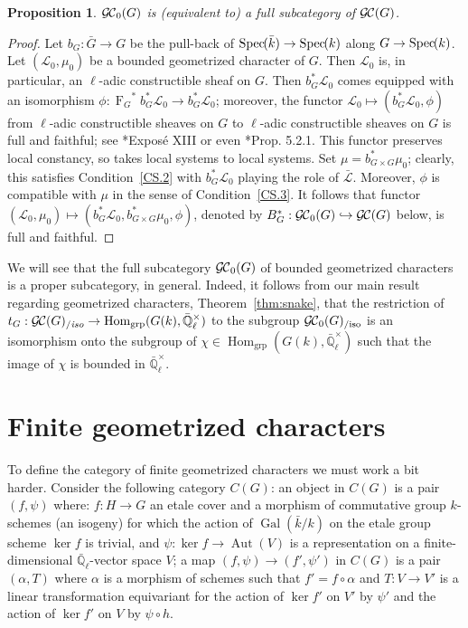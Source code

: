 \documentclass[11pt]{amsart}
\theoremstyle{plain}
\newtheorem{proposition}[theorem]{Proposition}
\theoremstyle{definition}
\theoremstyle{remark}
\newcommand{\Spec}[1]{{\operatorname{Spec}\hskip-1pt( #1 )}}
\newcommand{\EE}{\mathbb{\bar Q}_\ell}
\newcommand{\bFq}{\bar{k}}
\newcommand{\Fq}{k}
\newcommand{\EEx}{\EE^\times}
\DeclareMathOperator{\Gal}{Gal}
\newcommand{\Frob}[1]{{\operatorname{F}_{#1}}}
\DeclareMathOperator{\Aut}{Aut}
\DeclareMathOperator{\Hom}{Hom}
\newcommand{\cdef}[1]{{{\color{blue}#1}\index{#1}}}
\newcommand{\cs}[1]{{\mathcal{#1}}}
\newcommand{\gcs}[1]{{\mathcal{\bar #1}}}
\newcommand{\GC}{{\mathcal{G\hskip-0.8pt C}}}
\newcommand{\GCb}{{\GC_0}}
\newcommand{\GCiso}[1]{\GC(#1)_{/\textit{iso}}}
\newcommand{\GCbiso}[1]{\GCb(#1)_{/\text{iso}}}
\newcommand{\trFrob}[1]{t_{#1}}
\begin{document}
\begin{proposition}
$\GCb(G)$ is (equivalent to) a full subcategory of $\GC(G)$.
\end{proposition}

\begin{proof}
 Let $b_G : {\bar G} \to G$ be the pull-back of $\Spec{\bFq} \to \Spec{\Fq}$ along $G\to \Spec{\Fq}$.
 Let $(\cs{L}_0,\mu_0)$ be a bounded geometrized character of $G$. 
 Then $\cs{L}_0$ is, in particular, an $\ell$-adic constructible sheaf on $G$. 
 Then $b_G^* \cs{L}_0$ comes equipped with an isomorphism 
 $\phi : \Frob{G}^* b_G^*\cs{L}_0 \to b_G^* \cs{L}_0$; 
 moreover, the functor $\cs{L}_0 \mapsto (b_G^* \cs{L}_0,\phi)$  
 from $\ell$-adic constructible sheaves on $G$ to $\ell$-adic constructible sheaves on $G$
 is full and faithful; see \cite{SGA7.2}*{Expos\'e XIII} or even \cite{BBD}*{Prop. 5.2.1}. 
 This functor preserves local constancy, so takes local systems to local systems. 
 Set $\mu = b_{G\times G}^*\mu_0$; clearly, this satisfies Condition~\ref{CS.2} 
 with $b_G^*\cs{L}_0$ playing the role of $\gcs{L}$.
 Moreover, $\phi$ is compatible with $\mu$ in the sense of Condition~\ref{CS.3}.
 It follows that functor $(\cs{L}_0,\mu_0) \mapsto (b_G^*\cs{L}_0,b_{G\times G}^* \mu_0, \phi)$, denoted by  $B_G^*: \GCb(G) \hookrightarrow \GC(G)$ below, is full and faithful.
\end{proof}

We will see that the full subcategory $\GC_0(G)$ of bounded geometrized characters is a proper subcategory, in general. Indeed, it follows from our main result regarding geometrized characters, Theorem~\ref{thm:snake}, that the restriction of $\trFrob{G} : \GCiso{G} \to \Hom_\text{grp}(G(\Fq),\EEx)$ to the subgroup $\GCbiso{G}$ is an isomorphism onto the subgroup of $\chi \in \Hom_\text{grp}(G(\Fq),\EEx)$ such that the image of $\chi$ is bounded in $\EEx$. 

\section{Finite geometrized characters}\label{sec:finite}

 
To define the category of finite geometrized characters we must work a bit harder.
Consider the following category \cdef{$C(G)$}:
an object in $C(G)$ is a pair $(f,\psi)$ where: 
$f : H\to G$ an etale cover and a morphism of commutative group $\Fq$-schemes (an isogeny) 
for which the action of $\Gal(\bFq/\Fq)$ on the etale group scheme $\ker f$ is trivial, 
and $\psi : \ker f\to \Aut(V)$ is a representation on a finite-dimensional $\EE$-vector space $V$;
a map $(f,\psi) \to (f',\psi')$ in $C(G)$ is a pair $(\alpha,T)$ 
where $\alpha$ is a morphism of schemes such that $f' = f\circ \alpha$
and $T : V\to V'$ is a linear transformation equivariant 
for the action of $\ker f'$ on $V'$ by $\psi'$ 
and the action of $\ker f'$ on $V$ by $\psi \circ h$.
\end{document}
